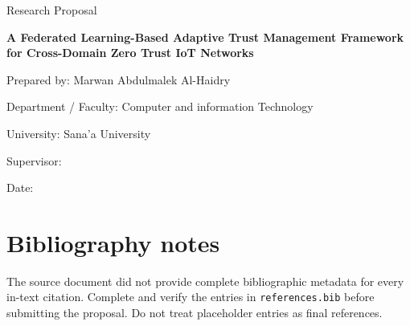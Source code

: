 \documentclass[12pt,a4paper,oneside]{scrreprt}
\newcommand{\thesistitle}{A Federated Learning-Based Adaptive Trust Management Framework for Cross-Domain Zero Trust IoT Networks}
\begin{document}
\begin{titlepage}
  \centering
  \vspace*{1.5cm}
  {\Large Research Proposal\par}
  \vspace{2cm}
  {\LARGE\bfseries \thesistitle\par}
  \vspace{2cm}
  {\large Prepared by: Marwan Abdulmalek Al-Haidry\par}
  \vspace{0.7cm}
  {\large Department / Faculty: Computer and information Technology \par}
  \vspace{0.7cm}
  {\large University: Sana'a University \par}
  \vfill
  {\large Supervisor: \underline{\hspace{7cm}}\par}
  \vspace{0.7cm}
  {\large Date: \underline{\hspace{8cm}}\par}
\end{titlepage}

\tableofcontents
\listoftables
\clearpage
{}






\appendix
\chapter*{Bibliography notes}
The source document did not provide complete bibliographic metadata for every
in-text citation. Complete and verify the entries in \texttt{references.bib}
before submitting the proposal. Do not treat placeholder entries as final references.
\end{document}

